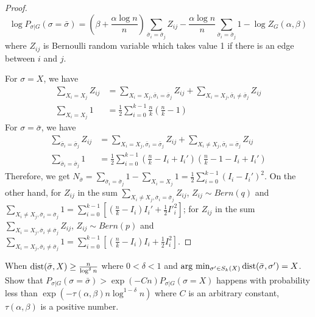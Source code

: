 \documentclass{article}
\begin{document}
\begin{proof}
	$$ \log P_{\sigma|G}(\sigma=\bar{\sigma}) = (\beta + \frac{\alpha \log n}{n}) \sum_{\bar{\sigma}_i = \bar{\sigma}_j} Z_{ij}
	- \frac{\alpha \log n}{n} \sum_{\bar{\sigma}_i = \bar{\sigma}_j} 1  - \log Z_G(\alpha, \beta)
	$$
	where $Z_{ij}$ is Bernoulli random variable which takes value 1 if there is an edge between $i$ and $j$.
	
	For $\sigma = X$, we have
	\begin{align*}
	\sum_{X_i = X_j} Z_{ij} &= \sum_{X_i = X_j, \bar{\sigma}_i = \bar{\sigma}_j} Z_{ij} + \sum_{X_i = X_j, \bar{\sigma}_i \neq \bar{\sigma}_j} Z_{ij} \\
	\sum_{X_i = X_j} 1 &= \frac{1}{2} \sum_{i=0}^{k-1} \frac{n}{k} ( \frac{n}{k} - 1 )
	\end{align*}
	For $\sigma = \bar{\sigma}$, we have
	\begin{align*}
	\sum_{\bar{\sigma}_i = \bar{\sigma}_j} Z_{ij} &= \sum_{X_i = X_j, \bar{\sigma}_i = \bar{\sigma}_j} Z_{ij} + \sum_{X_i \neq X_j, \bar{\sigma}_i = \bar{\sigma}_j} Z_{ij} \\
	\sum_{\bar{\sigma}_i = \bar{\sigma}_j} 1 &= \frac{1}{2} \sum_{i=0}^{k-1} (\frac{n}{k} - I_i + I_i') ( \frac{n}{k} - 1 - I_i + I_i')
	\end{align*}
	Therefore, we get
	$N_{\bar{\sigma}} = \sum_{\bar{\sigma}_i = \bar{\sigma}_j} 1  -\sum_{X_i = X_j} 1 = \frac{1}{2}\sum_{i=0}^{k-1} (I_i - I_i')^2 $.
	On the other hand, for $Z_{ij}$ in the sum $\sum_{X_i \neq X_j, \bar{\sigma}_i = \bar{\sigma}_j} Z_{ij}$, $Z_{ij} \sim Bern(q)$ and
	$\sum_{X_i \neq X_j, \bar{\sigma}_i = \bar{\sigma}_j} 1 = \sum_{i=0}^{k-1}[(\frac{n}{k} - I_i) I_i' + \frac{1}{2} I'^2_i ]$;
	for $Z_{ij}$ in the sum $\sum_{X_i = X_j, \bar{\sigma}_i \neq \bar{\sigma}_j} Z_{ij}$, $Z_{ij} \sim Bern(p)$ and
	$\sum_{X_i = X_j, \bar{\sigma}_i \neq \bar{\sigma}_j} 1 = \sum_{i=0}^{k-1}[(\frac{n}{k} - I_i) I_i + \frac{1}{2} I^2_i ]$.
\end{proof}
\begin{lemma}\label{lem:sigmaX}
		When $\operatorname{dist}(\bar{\sigma}, X) \geq \frac{n}{\log^{\delta} n}$ where $0<\delta < 1$ and $\arg\,\min_{\sigma'\in S_k(X)} \operatorname{dist}(\bar{\sigma}, \sigma') = X$. Show that
	$P_{\sigma | G}(\sigma = \bar{\sigma} ) > \exp(-Cn) P_{\sigma | G}(\sigma = X)$
	happens with probability less than $\exp(-\tau(\alpha,\beta) n \log^{1-\delta} n )$ where $C$ is an arbitrary constant, $\tau(\alpha,\beta)$ is a positive number.
\end{lemma}
\end{document}
